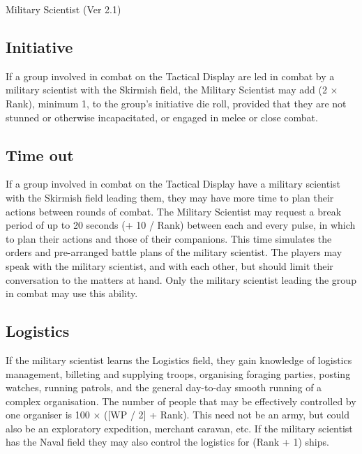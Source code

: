 \begin{Chapter}{Military Scientist (Ver 2.1)}
\subsection{Initiative}

If a group involved in combat on the Tactical Display are led in
combat by a military scientist with the Skirmish field, the Military
Scientist may add (2 × Rank), minimum 1, to the group’s initiative die
roll, provided that they are not stunned or otherwise incapacitated,
or engaged in melee or close combat.

\subsection{Time out}

If a group involved in combat on the Tactical Display have a military
scientist with the Skirmish field leading them, they may have more
time to plan their actions between rounds of combat.  The Military
Scientist may request a break period of up to 20 seconds (+ 10 / Rank)
between each and every pulse, in which to plan their actions and those
of their companions. This time simulates the orders and pre-arranged
battle plans of the military scientist.  The players may speak with
the military scientist, and with each other, but should limit their
conversation to the matters at hand. Only the military scientist
leading the group in combat may use this ability.

\subsection{Logistics}

If the military scientist learns the Logistics field, they gain
knowledge of logistics management, billeting and supplying troops,
organising foraging parties, posting watches, running patrols, and the
general day-to-day smooth running of a complex organisation.  The
number of people that may be effectively controlled by one organiser
is 100 × ([WP / 2] + Rank).  This need not be an army, but could also
be an exploratory expedition, merchant caravan, etc. If the military
scientist has the Naval field they may also control the logistics for
(Rank + 1) ships.

\end{Chapter}
